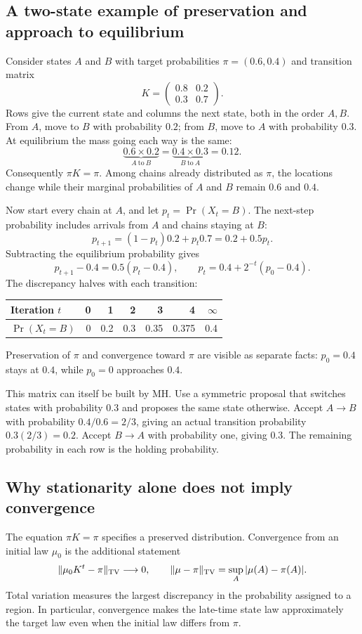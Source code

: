 \documentclass[11pt,a4paper]{article}
\begin{document}
\subsection{A two-state example of preservation and approach to equilibrium}
Consider states $A$ and $B$ with target probabilities
$\pi=(0.6,0.4)$ and transition matrix
\[
 K=\begin{pmatrix}
       0.8&0.2\\
       0.3&0.7
    \end{pmatrix}.
\]
Rows give the current state and columns the next state, both in the order
$A,B$. From $A$, move to $B$ with probability $0.2$; from $B$, move to $A$
with probability $0.3$. At equilibrium the mass going each way is the same:
\[
 \underbrace{0.6\times0.2}_{A\ \text{to}\ B}
 =\underbrace{0.4\times0.3}_{B\ \text{to}\ A}=0.12.
\]
Consequently $\pi K=\pi$. Among chains already distributed as $\pi$, the
locations change while their marginal probabilities of $A$ and $B$ remain
$0.6$ and $0.4$.

Now start every chain at $A$, and let $p_t=\Pr(X_t=B)$. The next-step
probability includes arrivals from $A$ and chains staying at $B$:
\[
 p_{t+1}=(1-p_t)0.2+p_t0.7=0.2+0.5p_t.
\]
Subtracting the equilibrium probability gives
\[
 p_{t+1}-0.4=0.5(p_t-0.4),\qquad
 p_t=0.4+2^{-t}(p_0-0.4).
\]
The discrepancy halves with each transition:
\begin{center}
\begin{tabular}{lrrrrrr}
\toprule
Iteration $t$ & 0 & 1 & 2 & 3 & 4 & $\infty$\\
\midrule
$\Pr(X_t=B)$ & 0 & 0.2 & 0.3 & 0.35 & 0.375 & 0.4\\
\bottomrule
\end{tabular}
\end{center}
Preservation of $\pi$ and convergence toward $\pi$ are visible as separate
facts: $p_0=0.4$ stays at $0.4$, while $p_0=0$ approaches $0.4$.

This matrix can itself be built by MH. Use a symmetric proposal that switches
states with probability $0.3$ and proposes the same state otherwise.
Accept $A\to B$ with probability $0.4/0.6=2/3$, giving an actual transition
probability $0.3(2/3)=0.2$. Accept $B\to A$ with probability one, giving
$0.3$. The remaining probability in each row is the holding probability.

\subsection{Why stationarity alone does not imply convergence}
The equation $\pi K=\pi$ specifies a preserved distribution. Convergence
from an initial law $\mu_0$ is the additional statement
\[
 \|\mu_0K^t-\pi\|_{\rm TV}\longrightarrow0,\qquad
 \|\mu-\pi\|_{\rm TV}=\sup_A|\mu(A)-\pi(A)|.
\]
Total variation measures the largest discrepancy in the probability assigned
to a region. In particular, convergence makes the late-time state law
approximately the target law even when the initial law differs from $\pi$.
\end{document}
